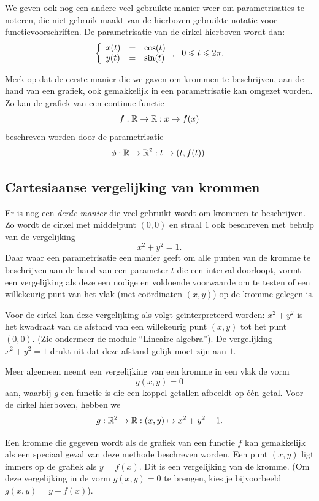 \documentclass{ximera}
\begin{document}
We geven ook nog een andere veel gebruikte manier weer om
parametrisaties te noteren, die niet gebruik maakt van de hierboven
gebruikte notatie voor functievoorschriften. De parametrisatie
van de cirkel hierboven wordt dan:
\[
\left\{
\ba{lcl}
x(t) &=& \cos(t)\\
y(t) &=& \sin(t)
\ea
\right.,~~0\leq t \leq 2\pi.
\]

Merk op dat de eerste manier die we gaven om krommen te beschrijven,
aan de hand van een grafiek, ook gemakkelijk in een parametrisatie kan
omgezet worden. Zo kan de grafiek van een continue functie
\[
f:\R\rightarrow\R:x\mapsto f(x)
\]
beschreven worden door de parametrisatie
\[
\phi:\R\rightarrow\R^2:t\mapsto (t,f(t)).
\]

\subsection{Cartesiaanse vergelijking van krommen}

Er is nog een {\em derde manier} die veel gebruikt wordt om krommen
te beschrijven. Zo wordt de cirkel met middelpunt $(0,0)$ en straal $1$
ook beschreven met behulp van de vergelijking
\[
x^2+y^2=1.
\]
Daar waar een parametrisatie een manier geeft om alle punten van de
kromme te beschrijven aan de hand van een parameter $t$ die een
interval doorloopt, vormt een vergelijking als deze een nodige en
voldoende voorwaarde om te testen of een willekeurig punt van het vlak
(met co\"ordinaten $(x,y)$) op de kromme gelegen is.

Voor de cirkel kan deze vergelijking als volgt ge\"interpreteerd
worden: $x^2+y^2$ is het kwadraat van de afstand van een willekeurig
punt $(x,y)$ tot het punt $(0,0)$. (Zie ondermeer de module
``Lineaire algebra''). De vergelijking $x^2+y^2=1$ drukt uit dat deze
afstand gelijk moet zijn aan $1$.

Meer algemeen neemt een vergelijking van een kromme in een vlak de vorm
\[
g(x,y)=0
\]
aan, waarbij $g$ een functie is die een koppel getallen afbeeldt op \'e\'en
getal. Voor de cirkel hierboven, hebben we
\[
g:\R^2\rightarrow\R:(x,y)\mapsto x^2+y^2-1.
\]

Een kromme die gegeven wordt als de grafiek van een functie $f$ kan
gemakkelijk als een speciaal geval van deze methode beschreven
worden. Een punt $(x,y)$ ligt immers op de grafiek als $y=f(x)$. Dit
is een vergelijking van de kromme. (Om deze vergelijking in de vorm
$g(x,y)=0$ te brengen, kies je bijvoorbeeld $g(x,y)=y-f(x)$).
\end{document}
